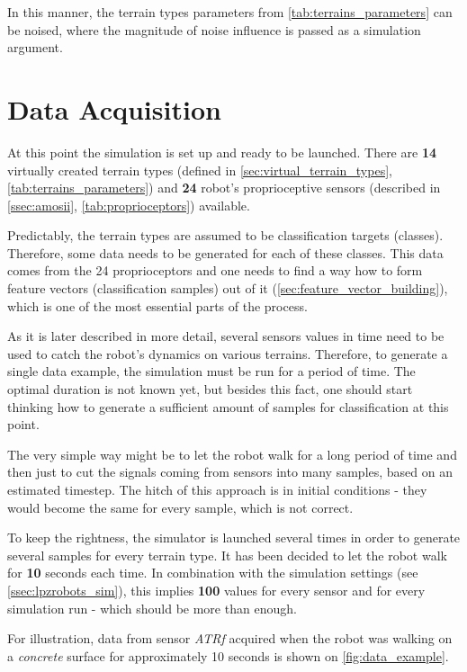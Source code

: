 In this manner, the terrain types parameters from \cref{tab:terrains_parameters} can be noised, where the magnitude of noise influence is passed as a simulation argument.

\section{Data Acquisition} \label{sec:data_acquisition}
At this point the simulation is set up and ready to be launched. There are \textbf{14} virtually created terrain types (defined in \cref{sec:virtual_terrain_types}, \cref{tab:terrains_parameters}) and \textbf{24} robot's proprioceptive sensors (described in \cref{ssec:amosii}, \cref{tab:proprioceptors}) available.

Predictably, the terrain types are assumed to be classification targets (classes). Therefore, some data needs to be generated for each of these classes. This data comes from the 24 proprioceptors and one needs to find a way how to form feature vectors (classification samples) out of it (\cref{sec:feature_vector_building}), which is one of the most essential parts of the process.

As it is later described in more detail, several sensors values in time need to be used to catch the robot's dynamics on various terrains. Therefore, to generate a single data example, the simulation must be run for a period of time. The optimal duration is not known yet, but besides this fact, one should start thinking how to generate a sufficient amount of samples for classification at this point.

The very simple way might be to let the robot walk for a long period of time and then just to cut the signals coming from sensors into many samples, based on an estimated timestep. The hitch of this approach is in initial conditions - they would become the same for every sample, which is not correct.

To keep the rightness, the simulator is launched several times in order to generate several samples for every terrain type. It has been decided to let the robot walk for \textbf{10} seconds each time. In combination with the simulation settings (see \cref{ssec:lpzrobots_sim}), this implies \textbf{100} values for every sensor and for every simulation run - which should be more than enough.

For illustration, data from sensor \textit{ATRf} acquired when the robot was walking on a \textit{concrete} surface for approximately 10 seconds is shown on \cref{fig:data_example}.

